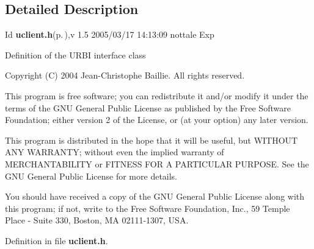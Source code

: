 \subsection{Detailed Description}
\begin{Desc}
\item[Id]{\bf uclient.h}{\rm (p.\,\pageref{uclient_8h})},v 1.5 2005/03/17 14:13:09 nottale Exp \end{Desc}


Definition of the URBI interface class

Copyright (C) 2004 Jean-Christophe Baillie. All rights reserved.

This program is free software; you can redistribute it and/or modify it under the terms of the GNU General Public License as published by the Free Software Foundation; either version 2 of the License, or (at your option) any later version.

This program is distributed in the hope that it will be useful, but WITHOUT ANY WARRANTY; without even the implied warranty of MERCHANTABILITY or FITNESS FOR A PARTICULAR PURPOSE. See the GNU General Public License for more details.

You should have received a copy of the GNU General Public License along with this program; if not, write to the Free Software Foundation, Inc., 59 Temple Place - Suite 330, Boston, MA 02111-1307, USA.

Definition in file {\bf uclient.h}.